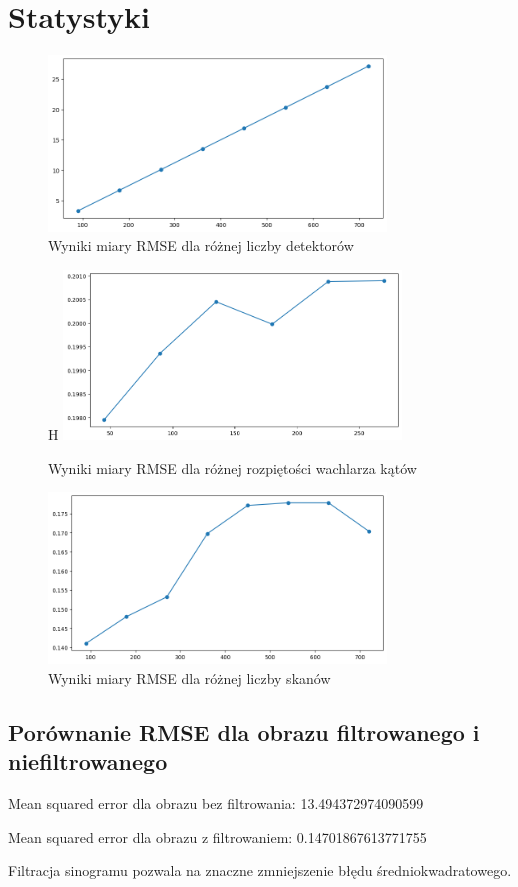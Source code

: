\documentclass[11pt,a4paper]{article}
\begin{document}
    \section{Statystyki}
    \begin{figure}[H]
        \centering
        \includegraphics[width=0.8\textwidth]{rmse_detectors}
        \caption{Wyniki miary RMSE dla różnej liczby detektorów}
    \end{figure}

    \begin{figure}{H}
        \centering
        \includegraphics[width=0.8\textwidth]{mse_fan}
        \caption{Wyniki miary RMSE dla różnej rozpiętości wachlarza kątów}
    \end{figure}

    \begin{figure}[H]
        \centering
        \includegraphics[width=0.8\textwidth]{inputoutput3}
        \caption{Wyniki miary RMSE dla różnej liczby skanów}
    \end{figure}

    \subsection{Porównanie RMSE dla obrazu filtrowanego i niefiltrowanego}
    Mean squared error dla obrazu bez filtrowania: 13.494372974090599

    Mean squared error dla obrazu z filtrowaniem: 0.14701867613771755

    Filtracja sinogramu pozwala na znaczne zmniejszenie błędu średniokwadratowego.
\end{document}
